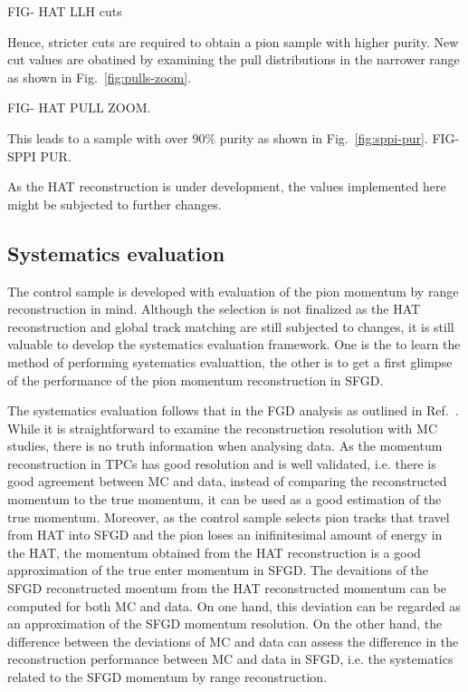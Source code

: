           FIG- HAT LLH cuts

          Hence, stricter cuts are required to obtain a pion sample with higher purity.  
          New cut values are obatined by examining the pull distributions in the narrower range as shown in Fig.~\ref{fig:pulls-zoom}.

          FIG- HAT PULL ZOOM.

          This leads to a sample with over $90\%$ purity as shown in Fig.~\ref{fig:sppi-pur}.
          FIG- SPPI PUR.

          As the HAT reconstruction is under development, the values implemented here might be subjected to further changes.

          \subsection{Systematics evaluation}
          \label{sec:sppi-syst}
          The control sample is developed with evaluation of the pion momentum by range reconstruction in mind.
          Although the selection is not finalized as the HAT reconstruction and global track matching are still subjected to changes, it is still valuable to develop the systematics evaluation framework.
          One is the to learn the method of performing systematics evaluattion, the other is to get a first glimpse of the performance of the pion momentum reconstruction in SFGD.

          The systematics evaluation follows that in the FGD analysis as outlined in Ref.~\cite{Jenkins:2022ljx}.
          While it is straightforward to examine the reconstruction resolution with MC studies, there is no truth information when analysing data.
          As the momentum reconstruction in TPCs has good resolution and is well validated, i.e. there is good agreement between MC and data, instead of comparing the reconstructed momentum to the true momentum, it can be used as a good estimation of the true momentum.
          Moreover, as the control sample selects pion tracks that travel from HAT into SFGD and the pion loses an inifinitesimal amount of energy in the HAT, the momentum obtained from the HAT reconstruction is a good approximation of the true enter momentum in SFGD.
          The devaitions of the SFGD reconstructed moentum from the HAT reconstructed momentum can be computed for both MC and data.
          On one hand, this deviation can be regarded as an approximation of the SFGD momentum resolution.
          On the other hand, the difference between the deviations of MC and data can assess the difference in the reconstruction performance between MC and data in SFGD, i.e. the systematics related to the SFGD momentum by range reconstruction.

